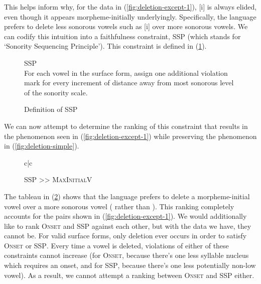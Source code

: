 \documentclass[12pt]{article}
\newcommand{\maxplusv}{\textsc{MaxInitialV}}
\newcommand{\ssp}{\textsc{SSP}}
\newcommand{\onset}{\textsc{Onset}}
\newcommand{\pref}[1]{(\ref{#1})}
\begin{document}
This helps inform why, for the data in \pref{fig:deletion-except-1}, [i] is
always elided, even though it appears morpheme-initially underlyingly.
Specifically, the language prefers to delete less sonorous vowels such as
[i] over more sonorous vowels. We can codify this intuition into a faithfulness
constraint, \ssp{} (which stands for `Sonority Sequencing Principle').
This constraint is defined in \pref{def:ssp}.

\begin{figure}[h]
    \caption{Definition of \ssp}
    \label{def:ssp}
    \begin{center}
        \ssp\\
        For each vowel in the surface form, assign one additional violation
        mark for every increment of distance away from most sonorous level of
        the sonority scale.
    \end{center}
\end{figure}

We can now attempt to determine the ranking of this constraint that results in
the phenomenon seen in \pref{fig:deletion-except-1} while preserving the
phenomenon in \pref{fig:deletion-simple}.

\begin{figure}[h!]
    \caption{\ssp{} >> \maxplusv}
    \label{tableau:ssp-wins}
    \begin{tableau}{c|c}
            \const{\ssp} \const{\maxplusv}
         \vio{**}     \vio{*}
                   \vio{***!}   \vio{}
    \end{tableau}
\end{figure}

The tableau in \pref{tableau:ssp-wins} shows that the language prefers to
delete a morpheme-initial vowel over a more sonorous vowel (\textipa{[\'e]}
rather than \textipa{[\'i]}). This ranking completely accounts for the pairs
shown in \pref{fig:deletion-except-1}. We would additionally like to rank
\onset{} and \ssp{} against each other, but with the data we have, they cannot
be. For valid surface forms, only deletion ever occurs in order to satisfy
\onset{} or \ssp. Every time a vowel is deleted, violations of either of these
constraints cannot increase (for \onset, because there's one less syllable
nucleus which requires an onset, and for \ssp, because there's one less
potentially non-low vowel). As a result, we cannot attempt a ranking between
\onset{} and \ssp{} either.
\end{document}

